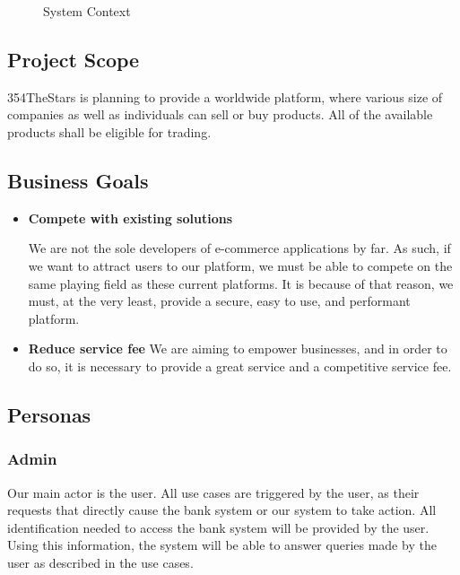 \documentclass[11pt]{article}
\newcounter{use case ID}
\newcounter{req ID}
\begin{document}
\clearpage

\begin{figure}[htbp]
    \caption{System Context}
    \label{fig:system-context}
\end{figure}

\subsection{Project Scope}
354TheStars is planning to provide a worldwide platform, where various size of companies as well as individuals can sell or buy products. All of the available products shall be eligible for trading.

\subsection{Business Goals}

\begin{itemize}
    \item \textbf{Compete with existing solutions}

        We are not the sole developers of e-commerce applications by far. As such, if we want to attract users to our platform, we must be able to compete on the same playing field as these current platforms. It is because of that reason, we must, at the very least, provide a secure, easy to use, and performant platform.

    \item \textbf{Reduce service fee}
        We are aiming to empower businesses, and in order to do so, it is necessary to provide a great service and a competitive service fee. 

\end{itemize}

\subsection{Personas} \label{actors}
\subsubsection{Admin}
Our main actor is the user. All use cases are triggered by the user, as their requests that directly cause the bank system or our system to take action. All identification needed to access the bank system will be provided by the user. Using this information, the system will be able to answer queries made by the user as described in the use cases.
\end{document}
